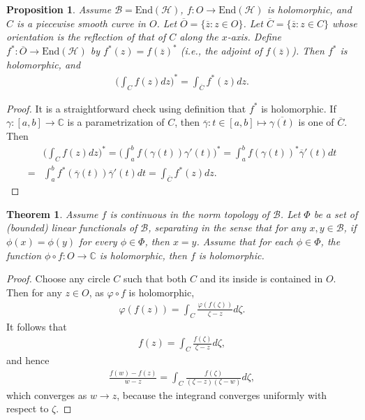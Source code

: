 \documentclass[12pt,a4paper,notitlepage]{article}
\theoremstyle{definition}
\theoremstyle{plain}
\newtheorem{thm}[df]{Theorem}
\newtheorem{pp}[df]{Proposition}
\newcommand{\mc}{\mathcal}
\newcommand{\ovl}{\overline}
\newcommand{\End}{\mathrm{End}} %
\newcommand{\Cbb}{\mathbb C}
\numberwithin{equation}{section}
\begin{document}
\begin{pp}\label{lb57}
	Assume $\mc B=\End(\mc H)$, $f:O\rightarrow\End(\mc H)$ is holomorphic, and $C$ is a piecewise smooth curve in $O$. Let $\ovl O=\{\ovl z:z\in O\}$. Let $\ovl C=\{\ovl z:z\in C\}$ whose orientation is the reflection of that of $C$ along the $x$-axis. Define $f^*:\ovl O\rightarrow\End(\mc H)$ by $f^*(z)=f(\ovl z)^*$ (i.e., the adjoint of $f(\ovl z)$). Then $f^*$ is holomorphic, and
	\begin{align}
		\Big(\int_C f(z)dz \Big)^*=\int_{\ovl C} f^*(z)dz.	
	\end{align}
\end{pp}


\begin{proof}
It is a straightforward check using definition that $f^*$ is holomorphic. If $\gamma:[a,b]\rightarrow\Cbb$ is a parametrization of $C$, then $\ovl \gamma:t\in[a,b]\mapsto \ovl{\gamma(t)}$ is one of $\ovl C$. Then
\begin{align*}
&\Big(\int_C f(z)dz \Big)^*=\Big(\int_a^b f(\gamma(t))\gamma'(t) \Big)^*=\int_a^b f(\gamma(t))^*\ovl\gamma'(t)dt\\
=&\int_a^b f^*(\ovl\gamma(t))\ovl\gamma'(t)dt=\int_{\ovl C} f^*(z)dz.
\end{align*}
\end{proof}



\begin{thm}\label{lb56}
Assume $f$ is continuous in the norm topology of $\mc B$. Let $\Phi$ be a set of (bounded) linear functionals of $\mc B$, separating in the sense that for any $x,y\in\mc B$, if $\phi(x)=\phi(y)$ for every $\phi\in\Phi$, then $x=y$. Assume that for each $\phi\in\Phi$, the function $\phi\circ f:O\rightarrow\Cbb$ is holomorphic, then $f$ is holomorphic.
\end{thm}

\begin{proof}
Choose any circle $C$ such that both $C$ and its inside is contained in $O$. Then for any $z\in O$, as $\varphi\circ f$ is holomorphic, 
\begin{align*}
\varphi(f(z))=\int_C \frac{\varphi(f(\zeta))}{\zeta-z}d\zeta.
\end{align*}
It follows that
\begin{align*}
f(z)=\int_C \frac {f(\zeta)}{\zeta-z}d\zeta,
\end{align*}
and hence
\begin{align*}
\frac{f(w)-f(z)}{w-z}=	\int_C \frac {f(\zeta)}{(\zeta-z)(\zeta-w)}d\zeta,
\end{align*}
which converges as $w\rightarrow z$, because the integrand converges uniformly with respect to $\zeta$.
\end{proof}
\end{document}
